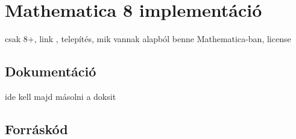 \section{Mathematica 8 implementáció}
csak 8+, link \cite{Nag11}, telepítés, mik vannak alapból benne Mathematica-ban, license

\subsection{Dokumentáció}
ide kell majd másolni a doksit

\subsection{Forráskód}
\lstset{
	language=Mathematica,
	tabsize=2,
	breaklines=true,
	basicstyle=\footnotesize,
	numbers=left,
	numberstyle=\footnotesize
}


